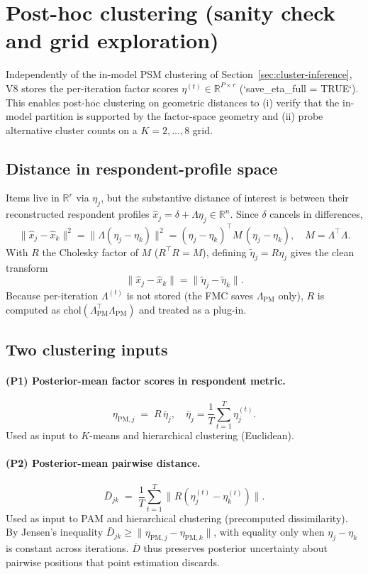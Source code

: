 \documentclass[11pt]{article}
\begin{document}
\section{Post-hoc clustering (sanity check and grid exploration)}\label{sec:posthoc}

Independently of the in-model PSM clustering of Section~\ref{sec:cluster-inference}, V8 stores the per-iteration factor scores $\eta^{(t)}\in\mathbb{R}^{P\times r}$ (`save_eta_full = TRUE`).
This enables post-hoc clustering on geometric distances to (i) verify that the in-model partition is supported by the factor-space geometry and (ii) probe alternative cluster counts on a $K=2,\dots,8$ grid.

\subsection{Distance in respondent-profile space}

Items live in $\mathbb{R}^r$ via $\eta_j$, but the substantive distance of interest is between their reconstructed respondent profiles $\hat x_j=\delta+\Lambda\eta_j\in\mathbb{R}^n$.
Since $\delta$ cancels in differences,
\[
\|\hat x_j-\hat x_k\|^2 = \|\Lambda(\eta_j-\eta_k)\|^2 = (\eta_j-\eta_k)^\top M\,(\eta_j-\eta_k),
\quad M=\Lambda^\top\Lambda.
\]
With $R$ the Cholesky factor of $M$ ($R^\top R=M$), defining $\tilde\eta_j=R\eta_j$ gives the clean transform
\[
\|\hat x_j-\hat x_k\|=\|\tilde\eta_j-\tilde\eta_k\|.
\]
Because per-iteration $\Lambda^{(t)}$ is not stored (the FMC saves $\Lambda_{\mathrm{PM}}$ only), $R$ is computed as $\mathrm{chol}(\Lambda_{\mathrm{PM}}^\top\Lambda_{\mathrm{PM}})$ and treated as a plug-in.

\subsection{Two clustering inputs}

\paragraph{(P1) Posterior-mean factor scores in respondent metric.}
\[
\eta_{\mathrm{PM},j} \;=\; R\,\bar\eta_j,
\quad
\bar\eta_j=\frac{1}{T}\sum_{t=1}^T \eta_j^{(t)}.
\]
Used as input to $K$-means and hierarchical clustering (Euclidean).

\paragraph{(P2) Posterior-mean pairwise distance.}
\[
\bar D_{jk} \;=\; \frac{1}{T}\sum_{t=1}^T \bigl\|R(\eta_j^{(t)}-\eta_k^{(t)})\bigr\|.
\]
Used as input to PAM and hierarchical clustering (precomputed dissimilarity).
By Jensen's inequality $\bar D_{jk}\geq \|\eta_{\mathrm{PM},j}-\eta_{\mathrm{PM},k}\|$, with equality only when $\eta_j-\eta_k$ is constant across iterations.
$\bar D$ thus preserves posterior uncertainty about pairwise positions that point estimation discards.
\end{document}
